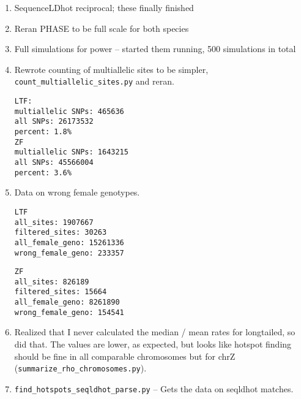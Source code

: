 \documentclass[idxtotoc,hyperref,openany,oneside]{labbook} %
\begin{document}
\begin{enumerate}
\item SequenceLDhot reciprocal; these finally finished
\item Reran PHASE to be full scale for both species
\item Full simulations for power -- started them running, 500 simulations in total
\item Rewrote counting of multiallelic sites to be simpler, \verb+count_multiallelic_sites.py+ and reran.
\begin{verbatim}
LTF:
multiallelic SNPs: 465636
all SNPs: 26173532
percent: 1.8%
ZF
multiallelic SNPs: 1643215
all SNPs: 45566004
percent: 3.6%
\end{verbatim}
\item Data on wrong female genotypes.
\begin{verbatim}
LTF
all_sites: 1907667
filtered_sites: 30263
all_female_geno: 15261336
wrong_female_geno: 233357
\end{verbatim} 
\begin{verbatim}
ZF
all_sites: 826189
filtered_sites: 15664
all_female_geno: 8261890
wrong_female_geno: 154541
\end{verbatim} 
\item Realized that I never calculated the median / mean rates for longtailed, so did that. The values are lower, as expected, but looks like hotspot finding should be fine in all comparable chromosomes but for chrZ (\verb+summarize_rho_chromosomes.py+).
\item \verb+find_hotspots_seqldhot_parse.py+ -- Gets the data on seqldhot matches.
\end{enumerate}
\end{document}
